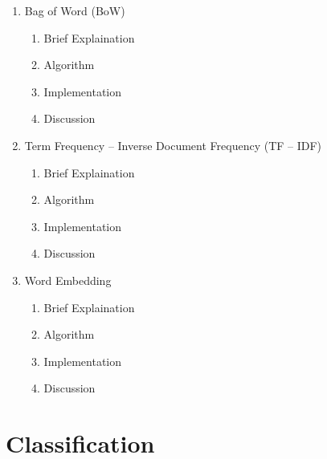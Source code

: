 \documentclass{article}
\begin{document}
\begin{enumerate}[label=3.\arabic*]
    \item Bag of Word (BoW)
    \begin{enumerate}[label=3.1.\arabic*]
        \item Brief Explaination
        \item Algorithm
        \item Implementation
        \item Discussion
    \end{enumerate}
    
    \item Term Frequency – Inverse Document Frequency (TF – IDF)
    \begin{enumerate}[label=3.2.\arabic*]
        \item Brief Explaination
        \item Algorithm
        \item Implementation
        \item Discussion
    \end{enumerate}
    
    \item Word Embedding
    \begin{enumerate}[label=3.3.\arabic*]
        \item Brief Explaination
        \item Algorithm
        \item Implementation
        \item Discussion
    \end{enumerate}
\end{enumerate}


\section{Classification}
\end{document}
